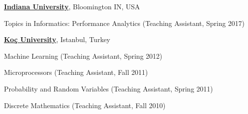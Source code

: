 \documentclass[10pt]{article}
\newenvironment{innerlist}[1][\enskip\textbullet]%
        {\begin{compactitem}[#1]}{\end{compactitem}}
\begin{document}
\begin{innerlist}
\item[] \href{https://www.iu.edu}{\textbf{Indiana University}},
Bloomington IN, USA
\begin{innerlist}
\item[] Topics in Informatics: Performance Analytics (Teaching Assistant, Spring 2017)
\end{innerlist}
\end{innerlist}
%
\begin{innerlist}
\item[] \href{http://www.ku.edu.tr}{\textbf{Ko\c{c} University}},
Istanbul, Turkey
\begin{innerlist}
\item[] Machine Learning (Teaching Assistant, Spring 2012)
\item[] Microprocessors (Teaching Assistant, Fall 2011)
\item[] Probability and  Random Variables (Teaching Assistant, Spring 2011)
\item[] Discrete Mathematics (Teaching Assistant, Fall 2010)
\end{innerlist}
\end{innerlist}
\end{document}

